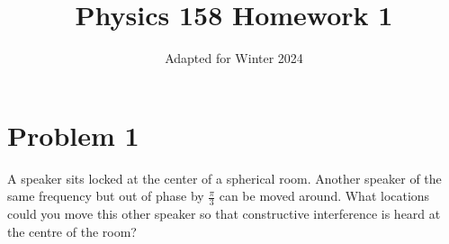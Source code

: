 \documentclass[11pt, fleqn]{article}
\title{Physics 158 Homework 1}
\author{}
\date{Adapted for Winter 2024}
\begin{document}
\allowdisplaybreaks

\maketitle

\section*{Problem 1}
A speaker sits locked at the center of a spherical room. Another speaker
of the same frequency but out of phase by $\frac{\pi}{3}$ can be moved around. 
What locations could you move this other speaker so that constructive interference is
heard at the centre of the room?
\end{document}
